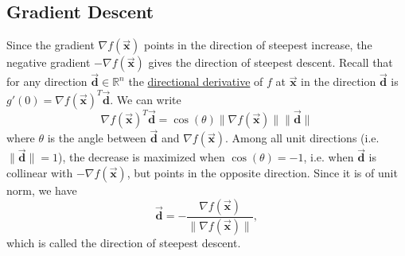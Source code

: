 \documentclass[9pt, headings=standardclasses, parskip=half]{scrartcl}
\renewcommand{\emph}[1]{\textcolor{mypurple}{#1}}
\newcommand{\vect}[1]{\vec{\boldsymbol{#1}}}
\begin{document}
\subsection{Gradient Descent}
\label{subsec:gradient_descent}
\begin{center}
\end{center}

Since the gradient \(\nabla f(\vect{x})\) points in the direction of steepest increase, the negative gradient \(-\nabla f(\vect{x})\) gives the direction of steepest descent. 
Recall that for any direction \(\vect{d}\in\mathbb{R}^{n}\) the \hyperlink{directional_derivative}{directional derivative} of \(f\) at \(\vect{x}\) in the direction \(\vect{d}\) is
\(
g'(0)=\nabla f(\vect{x})^{T}\vect{d}
\). We can write 
\[
\nabla f(\vect{x})^{T}\vect{d} = \cos(\theta)\|\nabla f(\vect{x})\| \|\vect{d}\| 
\]
where \(\theta\) is the angle between \(\vect{d}\) and \(\nabla f(\vect{x})\).
Among all unit directions (i.e. \(\|\vect{d}\|=1\)), the decrease is maximized when \(\cos(\theta)=-1\), i.e. when \(\vect{d}\) is collinear with \(-\nabla f(\vect{x})\), but points in the opposite direction. 
Since it is of unit norm, we have
\[
\vect{d}=-\frac{\nabla f(\vect{x})}{\|\nabla f(\vect{x})\|},
\] 
which is called the \emph{direction of steepest descent}.
\end{document}

